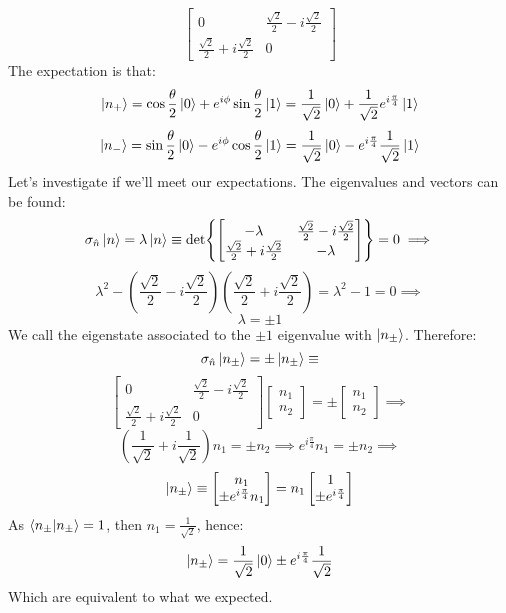 \documentclass{article}
\begin{document}
$$\begin{bmatrix}
    0 & \frac{\sqrt{2}}{2} - i\frac{\sqrt{2}}{2} \\
    \frac{\sqrt{2}}{2} + i\frac{\sqrt{2}}{2} & 0
\end{bmatrix}$$
The expectation is that:
$$\ket{n_+} = \cos{\frac{\theta}{2}}\ket{0} + e^{i\phi}\sin{\frac{\theta}{2}}\ket{1} = \frac{1}{\sqrt{2}}\ket{0} + \frac{1}{\sqrt{2}}e^{i\frac{\pi}{4}}\ket{1}$$
$$\ket{n_-} = \sin{\frac{\theta}{2}}\ket{0} - e^{i\phi}\cos{\frac{\theta}{2}}\ket{1} = \frac{1}{\sqrt{2}}\ket{0} - e^{i\frac{\pi}{4}}\frac{1}{\sqrt{2}}\ket{1}$$
Let's investigate if we'll meet our expectations. The eigenvalues and vectors can be found:
$$\sigma_{\hat{n}}\ket{n} = \lambda \ket{n} \equiv \det{\begin{bmatrix}
    -\lambda & \frac{\sqrt{2}}{2} - i\frac{\sqrt{2}}{2} \\
    \frac{\sqrt{2}}{2} + i\frac{\sqrt{2}}{2} & -\lambda
\end{bmatrix}} = 0 \implies$$
$$\lambda^2 - (\frac{\sqrt{2}}{2} - i\frac{\sqrt{2}}{2})(\frac{\sqrt{2}}{2} + i\frac{\sqrt{2}}{2}) = \lambda^2 - 1 = 0 \implies$$
$$\lambda = \pm 1$$
We call the eigenstate associated to the $\pm 1$ eigenvalue with $\ket{n_{\pm}}$. Therefore:
$$\sigma_{\hat{n}} \ket{n_\pm} = \pm \ket{n_\pm} \equiv$$
$$\begin{bmatrix}
    0 & \frac{\sqrt{2}}{2} - i\frac{\sqrt{2}}{2} \\
    \frac{\sqrt{2}}{2} + i\frac{\sqrt{2}}{2} & 0
\end{bmatrix}\begin{bmatrix}
    n_1 \\
    n_2
\end{bmatrix} = \pm \begin{bmatrix}
    n_1 \\
    n_2
\end{bmatrix} \implies$$
$$(\frac{1}{\sqrt{2}} + i\frac{1}{\sqrt{2}})n_1 = \pm n_2 \implies e^{i\frac{\pi}{4}}n_1 = \pm n_2 \implies $$
$$\ket{n_\pm} \equiv \begin{bmatrix}
    n_1 \\ 
    \pm e^{i\frac{\pi}{4}}n_1
\end{bmatrix} = n_1\begin{bmatrix}
    1 \\ 
    \pm e^{i\frac{\pi}{4}}
\end{bmatrix}$$
As $\braket{n_\pm}{n_\pm} = 1$, then $n_1 = \frac{1}{\sqrt{2}}$, hence:
$$\ket{n_\pm} = \frac{1}{\sqrt{2}}\ket{0} \pm e^{i\frac{\pi}{4}}\frac{1}{\sqrt{2}}$$
Which are equivalent to what we expected.
\end{document}
